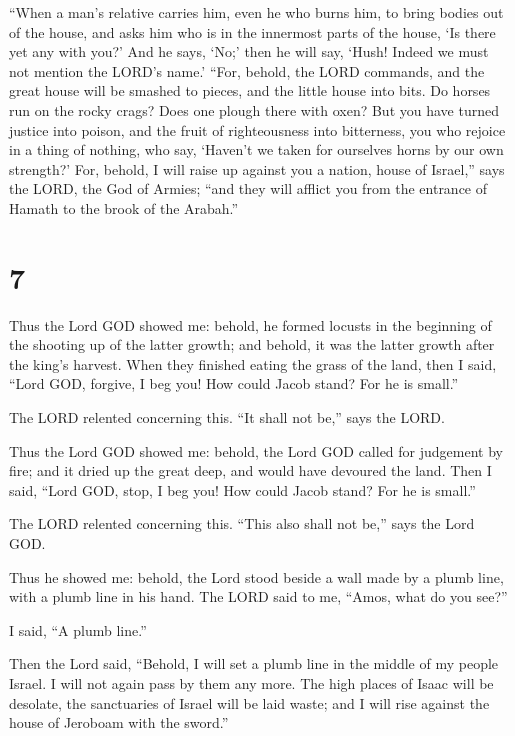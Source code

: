  ``When a man's relative carries him, even he who burns
him, to bring bodies out of the house, and asks him who is in the
innermost parts of the house, `Is there yet any with you?' And he says,
`No;' then he will say, `Hush! Indeed we must not mention the LORD's
name.'  ``For, behold, the LORD commands, and the great
house will be smashed to pieces, and the little house into bits.
 Do horses run on the rocky crags? Does one plough there
with oxen? But you have turned justice into poison, and the fruit of
righteousness into bitterness,  you who rejoice in a thing
of nothing, who say, `Haven't we taken for ourselves horns by our own
strength?'  For, behold, I will raise up against you a
nation, house of Israel,'' says the LORD, the God of Armies; ``and they
will afflict you from the entrance of Hamath to the brook of the
Arabah.''

\hypertarget{section-6}{%
\section{7}\label{section-6}}

 Thus the Lord GOD showed me: behold, he formed locusts in
the beginning of the shooting up of the latter growth; and behold, it
was the latter growth after the king's harvest.  When they
finished eating the grass of the land, then I said, ``Lord GOD, forgive,
I beg you! How could Jacob stand? For he is small.''

 The LORD relented concerning this. ``It shall not be,''
says the LORD.

 Thus the Lord GOD showed me: behold, the Lord GOD called
for judgement by fire; and it dried up the great deep, and would have
devoured the land.  Then I said, ``Lord GOD, stop, I beg
you! How could Jacob stand? For he is small.''

 The LORD relented concerning this. ``This also shall not
be,'' says the Lord GOD.

 Thus he showed me: behold, the Lord stood beside a wall
made by a plumb line, with a plumb line in his hand.  The
LORD said to me, ``Amos, what do you see?''

I said, ``A plumb line.''

Then the Lord said, ``Behold, I will set a plumb line in the middle of
my people Israel. I will not again pass by them any more. 
The high places of Isaac will be desolate, the sanctuaries of Israel
will be laid waste; and I will rise against the house of Jeroboam with
the sword.''

